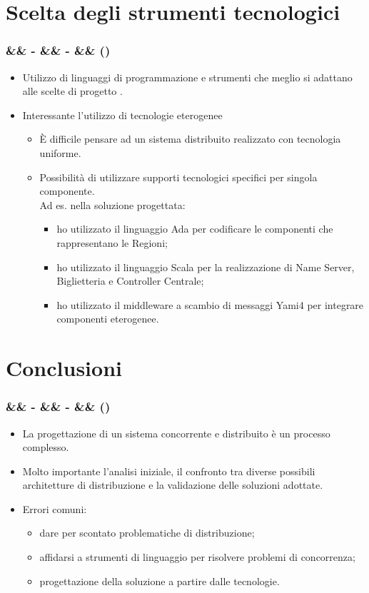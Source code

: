 \documentclass[slidestop,compress,blackandwhite]{beamer}
\newcommand{\cm}[1]{\vspace{#1cm}}
\newcommand{\newtitle}[4]{
	#1 
	\ifx&#2&%
	\else
  		\large- #2
	\fi
	\ifx&#3&%
	\else
  		\normalsize- #3
	\fi
	\ifx&#4&%
	\else
  		\normalsize (#4)
	\fi
}
\newcommand{\newframe}[5]{
	\begin{frame}
		\frametitle{\newtitle{#1}{#2}{#3}{#4}}
		#5
	\end{frame}
}
\newcommand{\myitemize}[1]{
	\begin{itemize}\itemsep4pt
	#1
	\end{itemize}
}
\begin{document}
\section{Scelta degli strumenti tecnologici}\label{tec}
	
	\newframe{}{}{}{}{
		\myitemize {
			\item Utilizzo di linguaggi di programmazione e strumenti che meglio si adattano alle scelte di progetto .
			\item Interessante l'utilizzo di tecnologie eterogenee
				\myitemize {
					\item \`E difficile pensare ad un sistema distribuito realizzato con tecnologia uniforme.
					\item Possibilità di utilizzare supporti tecnologici specifici per singola componente.\\Ad es. nella soluzione progettata:
						\myitemize {
							\item ho utilizzato il linguaggio Ada per codificare le componenti che rappresentano le Regioni;
							\item ho utilizzato il linguaggio Scala per la realizzazione di Name Server, Biglietteria e Controller Centrale;
							\item ho utilizzato il middleware a scambio di messaggi Yami4 per integrare componenti eterogenee. 
						}
				}
		}
	}
\section{Conclusioni}\label{conclusions}
	
	\newframe{}{}{}{}{
		\cm{0.5}
		\myitemize {
			\item La progettazione di un sistema concorrente e distribuito è un processo complesso.
			\item Molto importante l'analisi iniziale, il confronto tra diverse possibili architetture di distribuzione e la validazione delle soluzioni adottate.
			\item Errori comuni:
				\myitemize {
					\item dare per scontato problematiche di distribuzione;
					\item affidarsi a strumenti di linguaggio per risolvere problemi di concorrenza;
					\item progettazione della soluzione a partire dalle tecnologie.
				}
		}
	}
	
\end{document}
